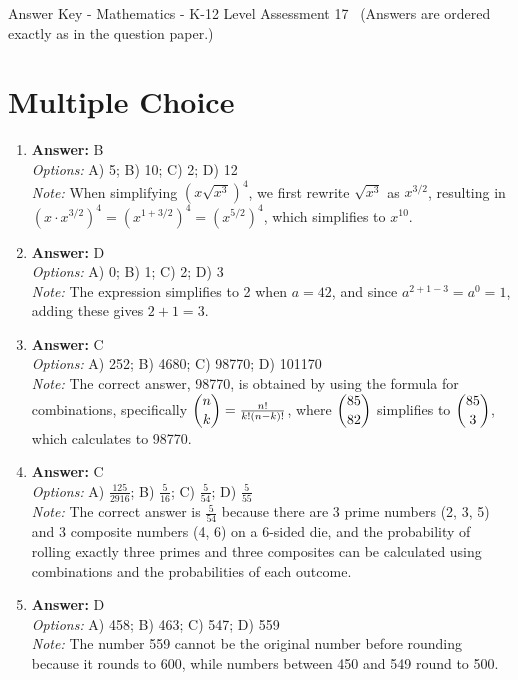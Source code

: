 \documentclass[12pt]{article}
\begin{document}
\begin{center}
Answer Key - Mathematics - K-12 Level Assessment 17 \
\small (Answers are ordered exactly as in the question paper.)
\end{center}

\section*{Multiple Choice}
\begin{enumerate}[label=\arabic*.]
\item \textbf{Answer:} B
\\ \textit{Options:} A) 5; B) 10; C) 2; D) 12
\\ \textit{Note:} When simplifying $(x\sqrt{x^3})^4$, we first rewrite $\sqrt{x^3}$ as $x^{3/2}$, resulting in $(x \cdot x^{3/2})^4 = (x^{1 + 3/2})^4 = (x^{5/2})^4$, which simplifies to $x^{10}$.
\item \textbf{Answer:} D
\\ \textit{Options:} A) 0; B) 1; C) 2; D) 3
\\ \textit{Note:} The expression simplifies to 2 when \( a = 42 \), and since \( a^{2+1-3} = a^0 = 1 \), adding these gives \( 2 + 1 = 3 \).
\item \textbf{Answer:} C
\\ \textit{Options:} A) 252; B) 4680; C) 98770; D) 101170
\\ \textit{Note:} The correct answer, 98770, is obtained by using the formula for combinations, specifically $\dbinom{n}{k} = \frac{n!}{k!(n-k)!}$, where $\dbinom{85}{82}$ simplifies to $\dbinom{85}{3}$, which calculates to 98770.
\item \textbf{Answer:} C
\\ \textit{Options:} A) \ensuremath{\frac{125}{2916}}; B) \ensuremath{\frac{5}{16}}; C) \ensuremath{\frac{5}{54}}; D) \ensuremath{\frac{5}{55}}
\\ \textit{Note:} The correct answer is \(\frac{5}{54}\) because there are 3 prime numbers (2, 3, 5) and 3 composite numbers (4, 6) on a 6-sided die, and the probability of rolling exactly three primes and three composites can be calculated using combinations and the probabilities of each outcome.
\item \textbf{Answer:} D
\\ \textit{Options:} A) 458; B) 463; C) 547; D) 559
\\ \textit{Note:} The number 559 cannot be the original number before rounding because it rounds to 600, while numbers between 450 and 549 round to 500.
\end{enumerate}
\end{document}
